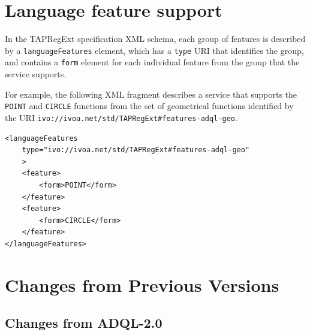 \documentclass[11pt,a4paper]{ivoa}
\newcommand{\TAPRegExtSpec}{TAPRegExt specification\xspace}
\begin{document}
\section{Language feature support}
\label{sec:features}

In the \TAPRegExtSpec XML schema, each group of features is
described by a \verb:languageFeatures: element, which has a \verb:type:
URI that identifies the group, and contains a \verb:form: element for each
individual feature from the group that the service supports.

For example, the following XML fragment describes a service that supports the
\verb:POINT: and \verb:CIRCLE: functions from the set of geometrical functions
identified by the URI \verb|ivo://ivoa.net/std/TAPRegExt#features-adql-geo|.

\begin{verbatim}
<languageFeatures
    type="ivo://ivoa.net/std/TAPRegExt#features-adql-geo"
    >
    <feature>
        <form>POINT</form>
    </feature>
    <feature>
        <form>CIRCLE</form>
    </feature>
</languageFeatures>    
\end{verbatim}

\section{Changes from Previous Versions}
\label{sec:changes}
\subsection{Changes from ADQL-2.0}
\end{document}
